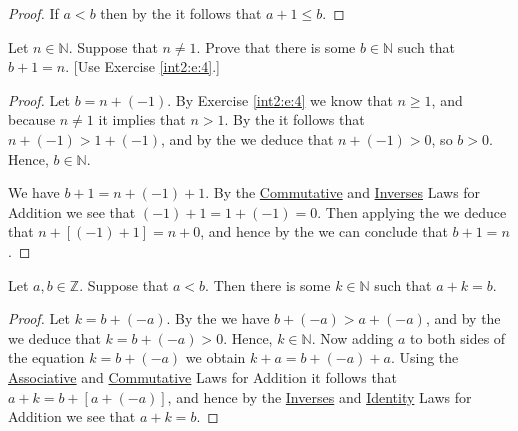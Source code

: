 \begin{proof}
	If $a < b$ then by the  it follows that $a + 1 \leq b$.
\end{proof}

\Newpage
\begin{exercise} %
	\label{int2:e:6}
	Let $n \in \mathbb{N}$. Suppose that $n \neq 1$. Prove that there is some $b \in \mathbb{N}$ such that $b + 1 = n$.
	\hfill [Use Exercise \ref{int2:e:4}.]
\end{exercise}

\begin{proof}
	Let $b = n + (-1)$. By Exercise \ref{int2:e:4} we know that $n \geq 1$, and because $n \not= 1$ it implies that $n > 1$. By the  it follows that $n + (-1) > 1 + (-1)$, and by the  we deduce that $n + (-1) > 0$, so $b > 0$. Hence, $b \in \mathbb{N}$.

	We have $b + 1 = n + (-1) + 1$. By the \hyperref[int2:d:oid:commutative_add]{Commutative} and \hyperref[int2:d:oid:inverses_add]{Inverses} Laws for Addition we see that $(-1) + 1 = 1 + (-1) = 0$. Then applying the  we deduce that $n + [(-1) + 1] = n + 0$, and hence by the  we can conclude that $b + 1 = n$.
\end{proof}

\addtocounter{exercise}{1}
\Newpage
\begin{lemma}
	\label{int2:e:8:l}
	Let $a, b \in \mathbb{Z}$. Suppose that $a < b$. Then there is some $k \in \mathbb{N}$ such that $a + k = b$.
\end{lemma}

\begin{proof}
	Let $k = b + (-a)$. By the  we have ${b + (-a) > a + (-a)}$, and by the  we deduce that $k = b + (-a) > 0$. Hence, $k \in \mathbb{N}$. Now adding $a$ to both sides of the equation $k = b + (-a)$ we obtain $k + a = b + (-a) + a$. Using the \hyperref[int2:d:oid:associative_add]{Associative} and \hyperref[int2:d:oid:commutative_add]{Commutative} Laws for Addition it follows that $a + k = b + [a + (-a)]$, and hence by the \hyperref[int2:d:oid:inverses_add]{Inverses} and \hyperref[int2:d:oid:identity_add]{Identity} Laws for Addition we see that $a + k = b$.
\end{proof}

